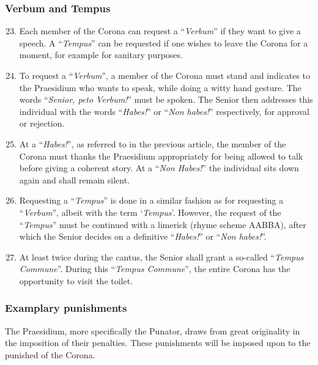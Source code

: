 \subsubsection*{Verbum and Tempus}
\begin{enumerate}
    \setcounter{enumi}{22}
    \item Each member of the Corona can request a ``\textit{Verbum}'' if they want to give a speech. A ``\textit{Tempus}'' can be requested if one wishes to leave the Corona for a moment, for example for sanitary purposes.
    \item To request a ``\textit{Verbum}'', a member of the Corona must stand and indicates to the Praesidium who wants to speak, while doing a witty hand gesture. The words ``\textit{Senior, peto Verbum!}'' must be spoken. The Senior then addresses this individual with the words ``\textit{Habes!}'' or ``\textit{Non habes!}'' respectively, for approval or rejection.
    \item At a ``\textit{Habes!}'', as referred to in the previous article, the member of the Corona must thanks the Praesidium appropriately for being allowed to talk before giving a coherent story. At a ``\textit{Non Habes!}'' the individual sits down again and shall remain silent.
    \item Requesting a ``\textit{Tempus}'' is done in a similar fashion as for requesting a ``\textit{Verbum}'', albeit with the term `\textit{Tempus}'. However, the request of the ``\textit{Tempus}'' must be continued with a limerick (rhyme scheme AABBA), after which the Senior decides on a definitive ``\textit{Habes!}'' or ``\textit{Non habes!}''.
    \item At least twice during the cantus, the Senior shall grant a so-called ``\textit{Tempus Commune}''. During this ``\textit{Tempus Commune}'', the entire Corona has the opportunity to visit the toilet.
\end{enumerate}


\subsubsection*{Examplary punishments}

The Praesidium, more specifically the Punator, draws from great originality in the imposition of their penalties. These punishments will be imposed upon to the punished of the Corona.

